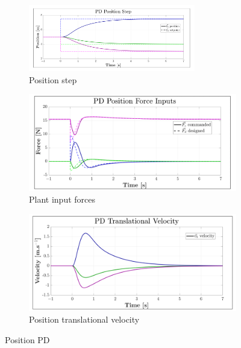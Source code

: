 \begin{figure}[htbp]
\vspace{-12pt}
\centering
\begin{subfigure}{\textwidth}
\centering
\includegraphics[width=0.8\textwidth]{graphs/PD_Position_Step}
\vspace{-6pt}
\caption{Position step}
\label{fig:PD_Position_Step}
\end{subfigure}
\begin{subfigure}{0.49\textwidth}
\centering
\includegraphics[width=\textwidth]{graphs/PD_Position_Force}
\caption{Plant input forces}
\label{fig:PD_Position_Force}
\end{subfigure}
\begin{subfigure}{0.49\textwidth}
\centering
\includegraphics[width=\textwidth]{graphs/PD_Position_Velocity}
\caption{Position translational velocity}
\label{fig:PD_Position_Velocity}
\end{subfigure}
\caption{Position PD}
\vspace{-24pt}
\end{figure}

